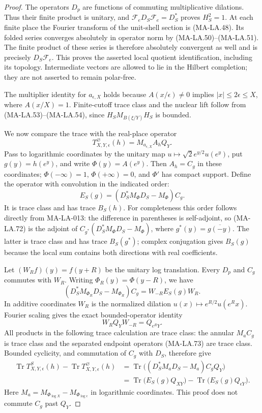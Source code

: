 \begin{proof}
The operators $D_p$ are functions of commuting multiplicative
dilations.  Thus their finite product is unitary, and
$\mathcal F_eD_S\mathcal F_e=D_S^*$ proves
$H_S^2=1$.  At each finite place the Fourier transform
of the unit-shell section is (MA-LA.48).  Its folded
series converges absolutely in operator norm by
(MA-LA.50)--(MA-LA.51).  The finite product of these
series is therefore absolutely convergent as well and
is precisely $D_S\mathcal F_e$.  This proves the asserted
local quotient identification, including its topology.
Intermediate vectors are allowed to lie in the Hilbert
completion; they are not asserted to remain polar-free.

The multiplier identity for $a_{\epsilon,X}$ holds because
$A(x/\epsilon)\ne0$ implies $|x|\le2\epsilon\le X$,
where $A(x/X)=1$.
Finite-cutoff trace class and the nuclear lift follow
from (MA-LA.53)--(MA-LA.54), since
$H_SM_{B(\xi/Y)}H_S$ is bounded.

We now compare the trace with the real-place operator
\[
                    T^\varnothing_{X,Y,\epsilon}(h)
                          =M_{a_{\epsilon,X}}A_hQ_Y.
 \tag{MA-LA.71}
\]
Pass to logarithmic coordinates by the unitary map
$u\mapsto\sqrt2e^{y/2}u(e^y)$, put $g(y)=h(e^y)$,
and write $\Phi(y)=A(e^y)$.  Then $A_h=C_g$ in these
coordinates; $\Phi(-\infty)=1$, $\Phi(+\infty)=0$,
and $\Phi'$ has compact support.
Define the operator with convolution in the indicated order:
\[
                E_S(g)=(D_S^*M_\Phi D_S-M_\Phi)C_g.
 \tag{MA-LA.72}
\]
It is trace class and has trace $B_S(h)$.
For completeness this order follows directly from
MA-LA-013: the difference in parentheses is self-adjoint,
so (MA-LA.72) is the adjoint of
$C_{g^*}(D_S^*M_\Phi D_S-M_\Phi)$, where
$g^*(y)=\overline{g(-y)}$.
The latter is trace class and has trace $B_S(g^*)$;
complex conjugation gives $B_S(g)$ because the local sum
contains both directions with real coefficients.

Let $(W_Rf)(y)=f(y+R)$ be the unitary log translation.
Every $D_p$ and $C_g$ commutes with $W_R$.
Writing $\Phi_R(y)=\Phi(y-R)$, we have
\[
 (D_S^*M_{\Phi_R}D_S-M_{\Phi_R})C_g
                          =W_{-R}E_S(g)W_R.
 \tag{MA-LA.73}
\]
In additive coordinates $W_R$ is the normalized dilation
$u(x)\mapsto e^{R/2}u(e^Rx)$.  Fourier scaling gives the
exact bounded-operator identity
\[
                       W_RQ_YW_{-R}=Q_{e^RY}.
 \tag{MA-LA.74}
\]
All products in the following trace calculation are trace
class: the annular $M_aC_g$ is trace class and the separated
endpoint operators (MA-LA.73) are trace class.  Bounded
cyclicity, and commutation of $C_g$ with $D_S$, therefore give
\[
 \begin{aligned}
 \operatorname{Tr}T^S_{X,Y,\epsilon}(h)
       -\operatorname{Tr}T^\varnothing_{X,Y,\epsilon}(h)
   &=\operatorname{Tr}\bigl((D_S^*M_aD_S-M_a)C_gQ_Y\bigr)\\
   &=\operatorname{Tr}\bigl(E_S(g)Q_{XY}\bigr)
                   -\operatorname{Tr}\bigl(E_S(g)Q_{\epsilon Y}\bigr).
 \end{aligned}
 \tag{MA-LA.75}
\]
Here $M_a=M_{\Phi_{\log X}}-M_{\Phi_{\log\epsilon}}$
in logarithmic coordinates.  This proof does not commute
$C_g$ past $Q_Y$.


\end{proof}
